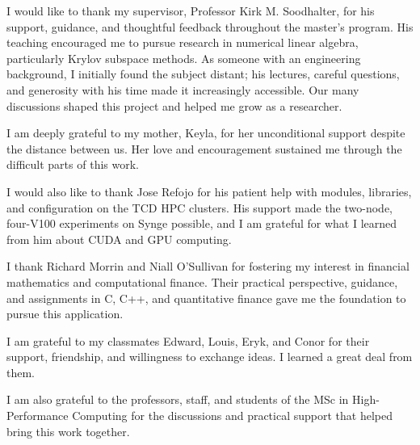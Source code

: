 
I would like to thank my supervisor, Professor Kirk M. Soodhalter, for his support, guidance, and thoughtful feedback throughout the master's program. His teaching encouraged me to pursue research in numerical linear algebra, particularly Krylov subspace methods. As someone with an engineering background, I initially found the subject distant; his lectures, careful questions, and generosity with his time made it increasingly accessible. Our many discussions shaped this project and helped me grow as a researcher.

I am deeply grateful to my mother, Keyla, for her unconditional support despite the distance between us. Her love and encouragement sustained me through the difficult parts of this work.

I would also like to thank Jose Refojo for his patient help with modules, libraries, and configuration on the TCD HPC clusters. His support made the two-node, four-V100 experiments on Synge possible, and I am grateful for what I learned from him about CUDA and GPU computing.

I thank Richard Morrin and Niall O'Sullivan for fostering my interest in financial mathematics and computational finance. Their practical perspective, guidance, and assignments in C, C++, and quantitative finance gave me the foundation to pursue this application.

I am grateful to my classmates Edward, Louis, Eryk, and Conor for their support, friendship, and willingness to exchange ideas. I learned a great deal from them.

I am also grateful to the professors, staff, and students of the MSc in High-Performance Computing for the discussions and practical support that helped bring this work together.
